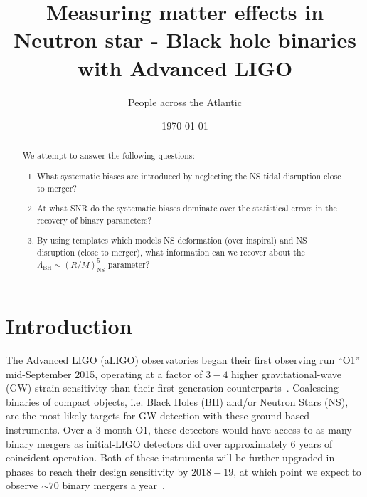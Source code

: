 \documentclass[aps,prd,amsmath,floats,floatfix, twocolumn,
superscriptaddress,nofootinbib,showpacs]{revtex4-1}
\begin{document}
\title{
Measuring matter effects in Neutron star - Black hole binaries with Advanced LIGO
}

\author{People across the Atlantic}

\date{\today}

\begin{abstract}
We attempt to answer the following questions: 
\begin{enumerate}
 \item What systematic biases are introduced by neglecting the NS tidal
 disruption close to merger? 
 \item At what SNR do the systematic biases dominate over the statistical 
 errors in the recovery of binary parameters?
 \item By using templates which models NS deformation (over inspiral) and 
 NS disruption (close to merger), what information can we recover about
 the $\Lambda_\mathrm{BH}\sim (R/M)^5_\mathrm{NS}$ parameter?
\end{enumerate}
\end{abstract}

\pacs{}

\maketitle

\section{Introduction}

The Advanced LIGO (aLIGO) observatories began their first observing run ``O1''
mid-September 2015, operating at a factor of $3-4$ higher gravitational-wave (GW) 
strain sensitivity than their first-generation counterparts~\cite{Shoemaker2009}.
Coalescing binaries of
compact objects, i.e. Black Holes (BH) and/or Neutron Stars (NS), are the most
likely targets for GW detection with these ground-based instruments. Over a
$3$-month O1, these detectors would have access to as
many binary mergers as initial-LIGO detectors did over approximately $6$ years
of coincident operation. Both of these instruments will be further upgraded in
phases to reach their design sensitivity by $2018-19$, at which point we expect to
observe $\sim 70$ binary mergers a year~\cite{Abadie:2010cf}.
\end{document}

